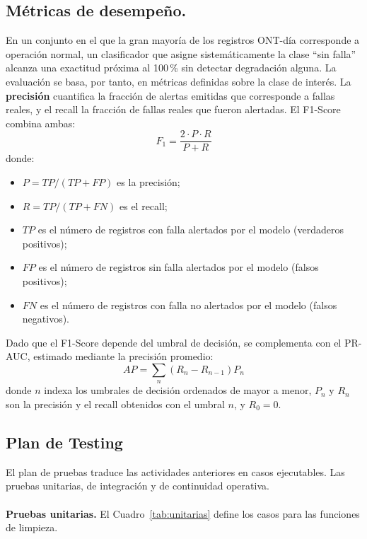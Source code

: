 \documentclass[12pt,a4paper]{article}
\begin{document}
\subsection{Métricas de desempeño.}
En un conjunto en el que la gran mayoría de los registros ONT-día corresponde a operación normal,
 un clasificador que asigne sistemáticamente la clase ``sin falla'' alcanza una exactitud próxima al 100\,\%
  sin detectar degradación alguna. La evaluación se basa, por tanto, en métricas definidas sobre la clase de interés.
   La \textbf{precisión} cuantifica la fracción de alertas emitidas que corresponde a fallas reales, y el
    recall la fracción de fallas reales que fueron alertadas. El F1-Score combina ambas:
\begin{equation}
    F_1 = \frac{2 \cdot P \cdot R}{P + R}
    \label{eq:f1}
\end{equation}
donde:
\begin{itemize}
    \item $P = TP/(TP + FP)$ es la precisión;
    \item $R = TP/(TP + FN)$ es el recall;
    \item $TP$ es el número de registros con falla alertados por el modelo (verdaderos positivos);
    \item $FP$ es el número de registros sin falla alertados por el modelo (falsos positivos);
    \item $FN$ es el número de registros con falla no alertados por el modelo (falsos negativos).
\end{itemize}
Dado que el F1-Score depende del umbral de decisión, se complementa con el PR-AUC, estimado mediante la precisión promedio:
\begin{equation}
    AP = \sum_{n} \left( R_n - R_{n-1} \right) P_n
    \label{eq:ap}
\end{equation}
donde $n$ indexa los umbrales de decisión ordenados de mayor a menor, $P_n$ y $R_n$ son la precisión y el recall obtenidos con el umbral $n$, y $R_0 = 0$. 


\subsection{Plan de Testing}
\label{subsec:testing}
\noindent
El plan de pruebas traduce las actividades anteriores en casos ejecutables. Las pruebas unitarias, de integración y de continuidad operativa.
\\
\noindent
\\
\textbf{Pruebas unitarias.}
\newline
El Cuadro~\ref{tab:unitarias} define los casos  para  las funciones de limpieza.
\end{document}
